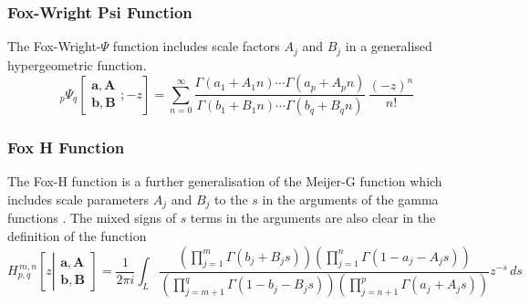 \documentclass[journal=jcisd8,manuscript=article,layout=onecolumn,pdftex,floatfix,amsmath,amssymb,10pt]{achemso}
\begin{document}
\subsubsection{Fox-Wright Psi Function}
The Fox-Wright-$\Psi$ function includes scale factors $A_j$ and $B_j$ in a generalised hypergeometric function.
\begin{equation}
{}_p\Psi_q \left[\begin{matrix} 
\mathbf{a},\mathbf{A} \\ 
\mathbf{b},\mathbf{B} \end{matrix} 
; -z \right]
=
\sum_{n=0}^\infty \frac{\Gamma( a_1 + A_1 n )\cdots\Gamma( a_p + A_p n )}{\Gamma( b_1 + B_1 n )\cdots\Gamma( b_q + B_q n )} \, \frac {(-z)^n} {n!}
\end{equation}

\subsubsection{Fox H Function}
The Fox-H function is a further generalisation of the Meijer-G function which includes scale parameters $A_j$ and $B_j$ to the $s$ in the arguments of the gamma functions \cite{}. The mixed signs of $s$ terms in the arguments are also clear in the definition of the function 
\begin{equation}
H_{p,q}^{\,m,n} \!\left[ z \left| \begin{matrix}
\mathbf{a},\mathbf{A} \\
\mathbf{b},\mathbf{B} \end{matrix} \right. \right]
= \frac{1}{2\pi i}\int_L
\frac
{(\prod_{j=1}^m\Gamma(b_j+B_js))(\prod_{j=1}^n\Gamma(1-a_j-A_js))}
{(\prod_{j=m+1}^q\Gamma(1-b_j-B_js))(\prod_{j=n+1}^p\Gamma(a_j+A_js))}
z^{-s} \, ds
\end{equation}
\end{document}
